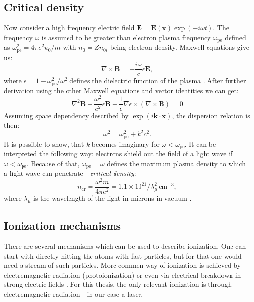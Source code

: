 \subsection*{Critical density}
Now consider a high frequency electric field $\bm{E} = \bm{E(x)}\exp\left(-i\omega t\right)$. The frequency $\omega$ is assumed to be greater than electron plasma frequency $\omega_{\mathrm{pe}}$ defined as $\omega_{\mathrm{pe}}^2=4\pi e^2 n_0/m$ with $n_0=Zn_{0i}$ being electron density. Maxwell equations give us:
\begin{equation}
	\nabla \times \bm{B} = -\frac{i\omega}{c}\epsilon\bm{E},
\end{equation}
where $\epsilon = 1 - \omega_{\mathrm{pe}}^2/\omega^2$ defines the dielectric function of the plasma \cite{laser-plasma4}. After further derivation using the other Maxwell equations and vector identities we can get:
\begin{equation}
	\nabla^2 \bm{B} + \frac{\omega^2}{c^2}\epsilon\bm{B} + \frac{1}{\epsilon}\nabla\epsilon \times \left(\nabla \times \bm{B}\right) = 0
\end{equation}
Assuming space dependency described by $\exp\left(i\bm{k}\cdot\bm{x}\right)$, the dispersion relation is then:
\begin{equation}
	\omega^2 = \omega_{\mathrm{pe}}^2 + k^2c^2.
\end{equation}
It is possible to show, that $k$ becomes imaginary for $\omega < \omega_{\mathrm{pe}}$. It can be interpreted the following way: electrons shield out the field of a light wave if $\omega < \omega_{\mathrm{pe}}$. Because of that, $\omega_{\mathrm{pe}}=\omega$ defines the maximum plasma density to which a light wave can penetrate - \textit{critical density}:
\begin{equation}
	n_{\mathrm{cr}} = \frac{\omega^2 m}{4 \pi e^2} = 1.1 \times 10^{21} / \lambda_\mu^2 \, \mathrm{cm}^{-3}, 
\end{equation}
where $\lambda_\mu$ is the wavelength of the light in microns in vacuum \cite{laser-plasma4}.

\subsection*{Ionization mechanisms}
There are several mechanisms which can be used to describe ionization. One can start with directly hitting the atoms with fast particles, but for that one would need a stream of such particles. More common way of ionization is achieved by electromagnetic radiation (photoionization) or even via electrical breakdown in strong electric fields \cite{plasma-intro}. For this thesis, the only relevant ionization is through electromagnetic radiation - in our case a laser.

